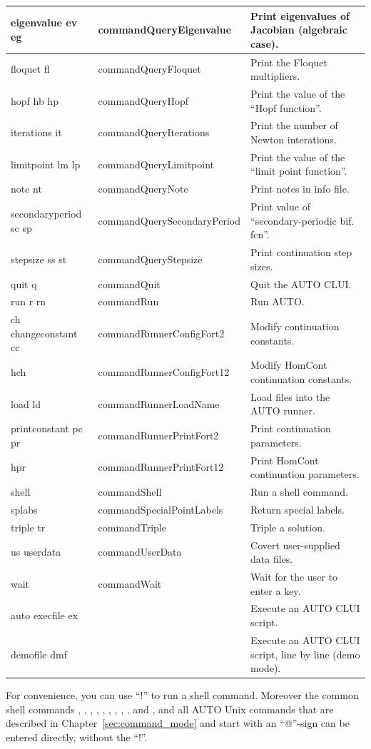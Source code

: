 \documentclass[12pt]{report}
\begin{document}
\begin{longtable}{|p{1.1in}|l|p{2.5in}|}
eigenvalue ev eg & commandQueryEigenvalue & Print eigenvalues of Jacobian (algebraic case).\\ \hline 
floquet fl & commandQueryFloquet & Print the Floquet multipliers.\\ \hline 
hopf hb hp & commandQueryHopf & Print the value of the ``Hopf function''.\\ \hline 
iterations it & commandQueryIterations & Print the number of Newton interations.\\ \hline 
limitpoint lm lp & commandQueryLimitpoint & Print the value of the ``limit point function''.\\ \hline 
note nt & commandQueryNote & Print notes in info file.\\ \hline 
secondaryperiod sc sp & commandQuerySecondaryPeriod & Print value of ``secondary-periodic bif. fcn''.\\ \hline 
stepsize ss st & commandQueryStepsize & Print continuation step sizes.\\ \hline 
quit q & commandQuit & Quit the AUTO CLUI.\\ \hline 
run r rn & commandRun & Run AUTO.\\ \hline 
ch changeconstant cc & commandRunnerConfigFort2 & Modify continuation constants.\\ \hline 
hch & commandRunnerConfigFort12 & Modify HomCont continuation constants.\\ \hline 
load ld & commandRunnerLoadName & Load files into the AUTO runner.\\ \hline 
printconstant pc pr & commandRunnerPrintFort2 & Print continuation parameters.\\ \hline 
hpr & commandRunnerPrintFort12 & Print HomCont continuation parameters.\\ \hline 
shell & commandShell & Run a shell command.\\ \hline 
splabs & commandSpecialPointLabels & Return special labels.\\ \hline
triple tr & commandTriple & Triple a solution.\\ \hline 
us userdata & commandUserData & Covert user-supplied data files.\\ \hline 
wait & commandWait & Wait for the user to enter a key.\\ \hline 
auto execfile ex & & Execute an AUTO CLUI script.\\ \hline
demofile dmf & & Execute an AUTO CLUI script, line by line (demo
mode). \\ \hline
\end{longtable}
For convenience, you can use ``!'' to run a shell command. Moreover
the common shell commands , ,
, ,
, , , ,
, and , and all AUTO Unix commands that are described
in Chapter~\ref{sec:command_mode} and start with an ``@''-sign can be
entered directly, without the ``!''.
\pagebreak
\end{document}
